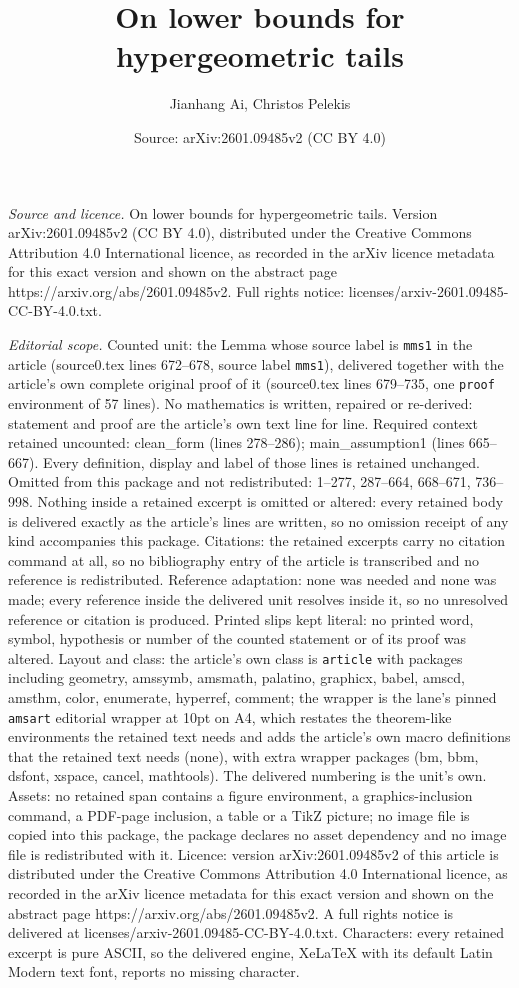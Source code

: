 \documentclass[10pt,a4paper]{amsart}
\title[On lower bounds for hypergeometric tails]{On lower bounds for hypergeometric tails}
\author{Jianhang Ai, Christos Pelekis}
\date{Source: arXiv:2601.09485v2 (CC BY 4.0)}
\begin{document}
\maketitle

\noindent\emph{Source and licence.} On lower bounds for hypergeometric tails. Version arXiv:2601.09485v2 (CC BY 4.0), distributed under the Creative Commons Attribution 4.0 International licence, as recorded in the arXiv licence metadata for this exact version and shown on the abstract page https://arxiv.org/abs/2601.09485v2. Full rights notice: licenses/arxiv-2601.09485-CC-BY-4.0.txt.\par\smallskip

\noindent\textit{Editorial scope.} Counted unit: the Lemma whose source label is \texttt{mms1} in the article (source0.tex lines 672--678, source label \texttt{mms1}), delivered together with the article's own complete original proof of it (source0.tex lines 679--735, one \texttt{proof} environment of 57 lines). No mathematics is written, repaired or re-derived: statement and proof are the article's own text line for line. Required context retained uncounted: clean\_form (lines 278--286); main\_assumption1 (lines 665--667). Every definition, display and label of those lines is retained unchanged. Omitted from this package and not redistributed: 1--277, 287--664, 668--671, 736--998. Nothing inside a retained excerpt is omitted or altered: every retained body is delivered exactly as the article's lines are written, so no omission receipt of any kind accompanies this package. Citations: the retained excerpts carry no citation command at all, so no bibliography entry of the article is transcribed and no reference is redistributed. Reference adaptation: none was needed and none was made; every reference inside the delivered unit resolves inside it, so no unresolved reference or citation is produced. Printed slips kept literal: no printed word, symbol, hypothesis or number of the counted statement or of its proof was altered. Layout and class: the article's own class is \texttt{article} with packages including geometry, amssymb, amsmath, palatino, graphicx, babel, amscd, amsthm, color, enumerate, hyperref, comment; the wrapper is the lane's pinned \texttt{amsart} editorial wrapper at 10pt on A4, which restates the theorem-like environments the retained text needs and adds the article's own macro definitions that the retained text needs (none), with extra wrapper packages (bm, bbm, dsfont, xspace, cancel, mathtools). The delivered numbering is the unit's own. Assets: no retained span contains a figure environment, a graphics-inclusion command, a PDF-page inclusion, a table or a TikZ picture; no image file is copied into this package, the package declares no asset dependency and no image file is redistributed with it. Licence: version arXiv:2601.09485v2 of this article is distributed under the Creative Commons Attribution 4.0 International licence, as recorded in the arXiv licence metadata for this exact version and shown on the abstract page https://arxiv.org/abs/2601.09485v2. A full rights notice is delivered at licenses/arxiv-2601.09485-CC-BY-4.0.txt. Characters: every retained excerpt is pure ASCII, so the delivered engine, XeLaTeX with its default Latin Modern text font, reports no missing character.
\end{document}
